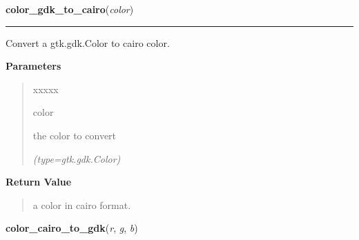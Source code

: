 \hspace{.8\funcindent}\begin{boxedminipage}{\funcwidth}

    \raggedright \textbf{color\_gdk\_to\_cairo}(\textit{color})

    \vspace{-1.5ex}

    \rule{\textwidth}{0.5\fboxrule}
\setlength{\parskip}{2ex}
    Convert a gtk.gdk.Color to cairo color.

\setlength{\parskip}{1ex}
      \textbf{Parameters}
      \vspace{-1ex}

      \begin{quote}
        \begin{Ventry}{xxxxx}

          \item[color]

          the color to convert

            {\it (type=gtk.gdk.Color)}

        \end{Ventry}

      \end{quote}

      \textbf{Return Value}
    \vspace{-1ex}

      \begin{quote}
      a color in cairo format.

      \end{quote}

    \end{boxedminipage}

    \label{pygtk_chart:basics:color_cairo_to_gdk}

    \vspace{0.5ex}

\hspace{.8\funcindent}\begin{boxedminipage}{\funcwidth}

    \raggedright \textbf{color\_cairo\_to\_gdk}(\textit{r}, \textit{g}, \textit{b})

\setlength{\parskip}{2ex}
\setlength{\parskip}{1ex}
    \end{boxedminipage}

    \label{pygtk_chart:basics:color_rgb_to_cairo}


